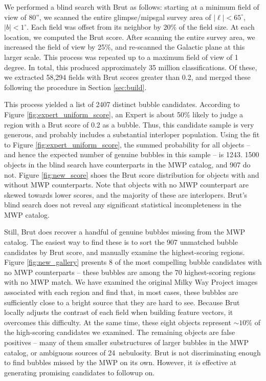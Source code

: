 We performed a blind search with Brut as follows: starting at a minimum field of view of 80'', we scanned the entire {\sc glimpse}/{\sc mipsgal} survey area of $|\ell| < 65^\circ$, $|b| < 1^\circ$. Each field was offset from its neighbor by 20\% of the field size. At each location, we computed the Brut score. After scanning the entire survey area, we increased the field of view by 25\%, and re-scanned the Galactic plane at this larger scale. This process was repeated up to a maximum field of view of 1 degree. In total, this produced approximately 35 million classifications. Of these, we extracted 58,294 fields with Brut scores greater than 0.2, and merged these following the procedure in Section \ref{sec:build}.

This process yielded a list of 2407 distinct bubble candidates. According to Figure \ref{fig:expert_uniform_score}, an Expert is about 50\% likely to judge a region with a Brut score of 0.2 as a bubble. Thus, this candidate sample is very generous, and probably includes a substantial interloper population. Using the fit to Figure \ref{fig:expert_uniform_score}, the summed probability for all objects -- and hence the expected number of genuine bubbles in this sample -- is 1243. 1500 objects in the blind search have counterparts in the MWP catalog, and 907 do not. Figure \ref{fig:new_score} shoes the Brut score distribution for objects with and without MWP counterparts. Note that objects with no MWP counterpart are skewed towards lower scores, and the majority of these are interlopers. Brut's blind search does not reveal any significant statistical incompleteness in the MWP catalog.

Still, Brut does recover a handful of genuine bubbles missing from the MWP catalog. The easiest way to find these is to sort the 907 unmatched bubble candidates by Brut score, and manually examine the highest-scoring regions. Figure \ref{fig:new_gallery} presents 8 of the most compelling bubble candidates with no MWP counterparts -- these bubbles are among the 70 highest-scoring regions with no MWP match. We have examined the original Milky Way Project images associated with each region and find that, in most cases, these bubbles are sufficiently close to a bright source that they are hard to see. Because Brut locally adjusts the contrast of each field when building feature vectors, it overcomes this difficulty. At the same time, these eight objects represent $\sim 10\%$ of the high-scoring candidates we examined. The remaining objects are false positives -- many of them smaller substructures of larger bubbles in the MWP catalog, or ambiguous sources of 24\um\, nebulosity. Brut is not discriminating enough to find bubbles missed by the MWP on its own. However, it \textit{is} effective at generating promising candidates to followup on.

